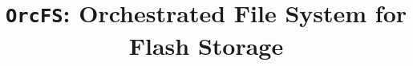\documentclass[pageno]{jpaper}
\begin{document}

\title{\texttt{OrcFS}: Orchestrated File System for Flash Storage} 


\date{}
\maketitle
\thispagestyle{empty}

\end{document}
